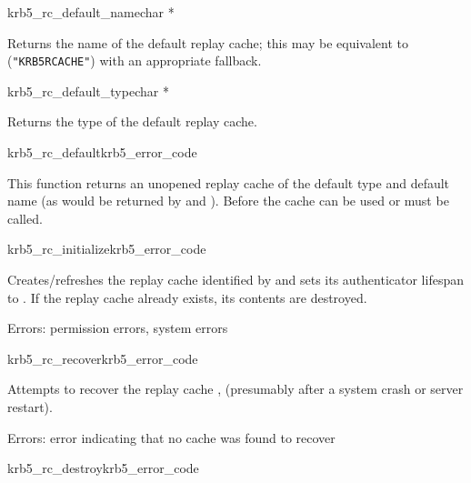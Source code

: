 \begin{funcdecl}{krb5_rc_default_name}{char *}{\funcin}
\end{funcdecl}

\begin{sloppypar}
Returns  the name of the default replay cache; this may be equivalent to
({\tt "KRB5RCACHE"}) with an appropriate fallback.
\end{sloppypar}

\begin{funcdecl}{krb5_rc_default_type}{char *}{\funcin}
\end{funcdecl}

Returns the type of the default replay cache.

\begin{funcdecl}{krb5_rc_default}{krb5_error_code}{\funcinout}
\end{funcdecl}

This function returns an unopened replay cache of the default type and
default name (as would be returned by 
and ).  Before the cache can be used
 or  must be
called.


\begin{funcdecl}{krb5_rc_initialize}{krb5_error_code}{\funcin}
\end{funcdecl}

Creates/refreshes the replay cache identified by  and sets its
authenticator lifespan to .  If the 
replay cache already exists, its contents are destroyed.

Errors: permission errors, system errors

\begin{funcdecl}{krb5_rc_recover}{krb5_error_code}{\funcin}
\end{funcdecl}
Attempts to recover the replay cache , (presumably after a
system crash or server restart).

Errors: error indicating that no cache was found to recover

\begin{funcdecl}{krb5_rc_destroy}{krb5_error_code}{\funcin}
\end{funcdecl}

